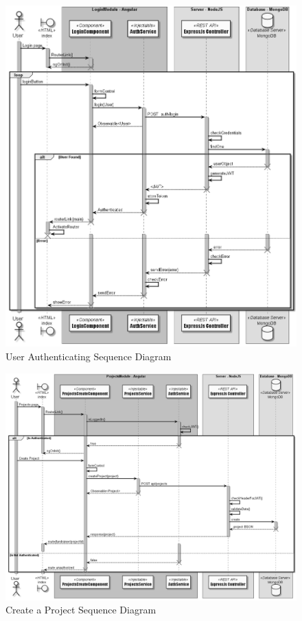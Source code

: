 \begin{figure}[!ht]
      \center
      \includegraphics[scale=0.45]{assets/authentication.png}
      \caption{User Authenticating Sequence Diagram}
      \label{fig:authentication seq}

\end{figure}

\begin{figure}[!ht]
      \center
      \includegraphics[scale=0.35]{assets/PostProject.png}
      \caption{Create a Project Sequence Diagram}
      \label{fig:PostProject seq}

\end{figure}

